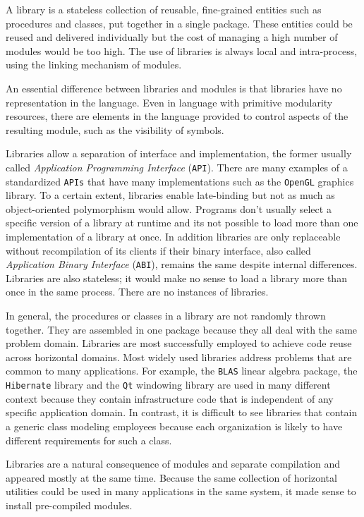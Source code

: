 A library is a stateless collection of reusable, fine-grained entities such as procedures and classes, put together in a single package. These entities could be reused
and delivered individually but the cost of managing a high number of modules would be too high. The use of libraries is always local and intra-process, using the linking
mechanism of modules.

An essential difference between libraries and modules is that libraries have no representation in the language. Even in language with primitive modularity
resources, there are elements in the language provided to control aspects of the resulting module, such as the visibility of symbols.

Libraries allow a separation of interface and implementation, the former usually called \emph{Application Programming Interface} (\texttt{API}). There are many examples
of a standardized \texttt{APIs} that have many implementations such as the \texttt{OpenGL} graphics library. To a certain extent, libraries enable late-binding but not
as much as object-oriented polymorphism would allow. Programs don't usually select a specific version of a library at runtime and its not possible to load more than
one implementation of a library at once. In addition libraries are only replaceable without recompilation of its clients if their binary interface, also called
\emph{Application Binary Interface} (\texttt{ABI}), remains the same despite internal differences. Libraries are also stateless; it would make no sense to load a library
more than once in the same process. There are no instances of libraries.

In general, the procedures or classes in a library are not randomly thrown together. They are assembled in one package because they all deal with the same problem domain.
Libraries are most successfully employed to achieve code reuse across horizontal domains. Most widely used libraries address problems that are common to many applications.
For example, the \texttt{BLAS} linear algebra package, the \texttt{Hibernate} library and the \texttt{Qt} windowing library are used in many different context because they
contain infrastructure code that is independent of any specific application domain. In contrast, it is difficult to see libraries that contain a generic class modeling employees
because each organization is likely to have different requirements for such a class.

Libraries are a natural consequence of modules and separate compilation and appeared mostly at the same time. Because the same collection of horizontal utilities
could be used in many applications in the same system, it made sense to install pre-compiled modules.

